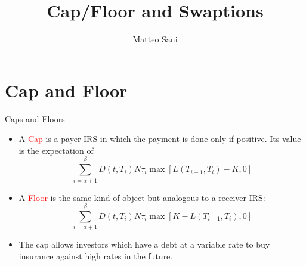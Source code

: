 \documentclass{beamer}
\title{Cap/Floor and Swaptions}
\author{Matteo Sani}
\begin{document}
	\begin{frame}[plain]
		\maketitle
	\end{frame}


\section{Cap and Floor}
\begin{frame}{Caps and Floors}
	\begin{itemize}
		\item A \textcolor{red}{Cap} is a payer IRS in which the payment is done only if positive. Its value is the expectation of 
		\begin{equation}
			\sum_{i=\alpha+1}^{\beta}D(t,T_i)N\tau_i\max\left[L(T_{i-1},T_i)-K,0\right]
		\end{equation} 
		\item A \textcolor{red}{Floor} is the same kind of object but analogous to a receiver IRS:
		\begin{equation}
			\sum_{i=\alpha+1}^{\beta}D(t,T_i)N\tau_i\max\left[K-L(T_{i-1},T_i),0\right]
			\label{eq:cap_floor}
		\end{equation} 
		\item The cap allows investors which have a debt at a variable rate to buy insurance against high rates in the future.
	\end{itemize}
\end{frame}
\end{document}

